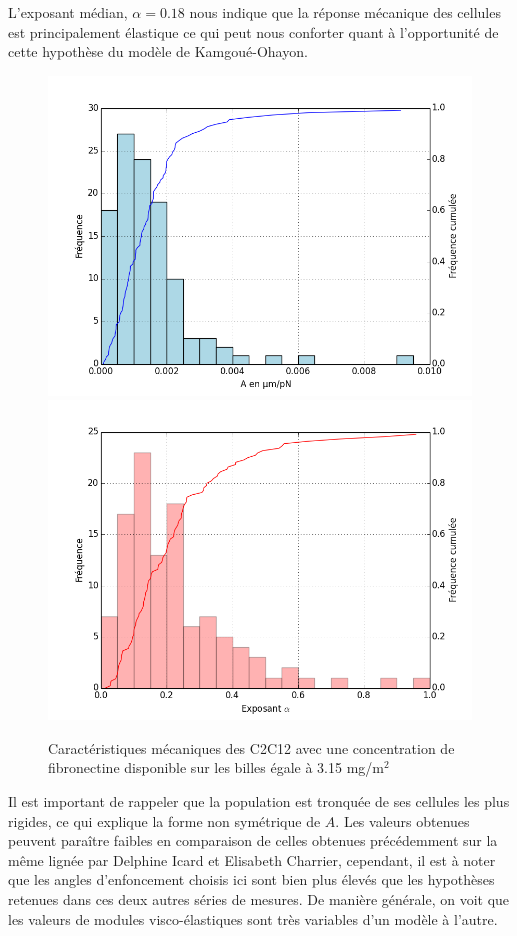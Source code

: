 \documentclass{report}
\begin{document}
L'exposant médian, $\alpha=0.18$ nous indique que la réponse mécanique des cellules est principalement élastique ce qui peut nous conforter quant à l'opportunité de cette hypothèse du modèle de Kamgoué-Ohayon.


\begin{figure}
\includegraphics[scale=0.5]{Figures/A0_Toutes.png} 
\includegraphics[scale=0.5]{Figures/E0_Toutes.png} 
\caption{Caractéristiques mécaniques des C2C12 avec une concentration de fibronectine disponible sur les billes égale à 3.15 mg/m$^2$}
\end{figure}
 
  
Il est important de rappeler que la population est tronquée de ses cellules les plus rigides, ce qui explique la forme non symétrique de $A$. 
Les valeurs obtenues peuvent paraître faibles en comparaison de celles obtenues précédemment sur la même lignée par Delphine Icard et Elisabeth Charrier, cependant, il est à noter que les angles d'enfoncement choisis ici sont bien plus élevés que les hypothèses retenues dans ces deux autres séries de mesures. De manière générale, on voit que les valeurs de modules visco-élastiques sont très variables d'un modèle à l'autre. 
\end{document}

